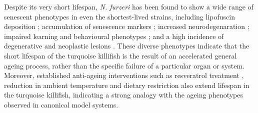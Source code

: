 Despite its very short lifespan, \textit{N. furzeri} has been found to show a wide range of senescent phenotypes in even the shortest-lived strains, including lipofuscin deposition \citep{genade2005annual};  accumulation of senescence markers \citep{genade2005annual};  increased neurodegenaration \citep{valenzano2006resveratrol1,valenzano2006resveratrol2}; impaired learning and behavioural phenotypes  \citep{genade2005annual,valenzano2006resveratrol1}; and a high incidence of degenerative and neoplastic lesions \citep{dicicco2011histopathology}. These diverse phenotypes indicate that the short lifespan of the turquoise killifish is the result of an accelerated general ageing process, rather than the specific failure of a particular organ or system.
Moreover, established anti-ageing interventions such as resveratrol treatment \citep{valenzano2006resveratrol1}, reduction in ambient temperature \citep{valenzano2006temperature} and dietary restriction \citep{terzibasi2009dr} also extend lifespan in the turquoise killifish, indicating a strong analogy with the ageing phenotypes observed in canonical model systems.




